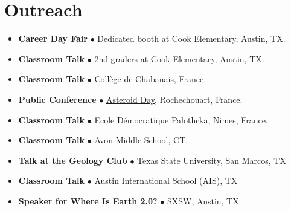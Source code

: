 \section*{Outreach}

\begin{itemize}[leftmargin=3.8em, labelsep=1.5em]
    \setlength\itemsep{-.5em}
    \item[\texttt{2026}] 
    \textbf{Career Day Fair} $\bullet$ Dedicated booth at Cook Elementary, Austin, TX.
    \item[\texttt{2026}] 
    \textbf{Classroom Talk} $\bullet$ 2nd graders at Cook Elementary, Austin, TX.
    \item[\texttt{2025}] 
    \textbf{Classroom Talk} $\bullet$ \href{https://etab.ac-poitiers.fr/coll-chabanais/spip.php?article903}{Collège de Chabanais}, France.
    \item[\texttt{2025}] 
    \textbf{Public Conference} $\bullet$ \href{https://cirir-edu.org/programme-asteroid-day-2025/}{Asteroid Day}, Rochechouart, France.
    \item[\texttt{2025}] 
    \textbf{Classroom Talk} $\bullet$ Ecole Démocratique Palothcka, Nimes, France.
    \item[\texttt{2022}] 
    \textbf{Classroom Talk} $\bullet$ Avon Middle School, CT.
    \item[\texttt{2018}] \textbf{Talk at the Geology Club} $\bullet$ Texas State University, San Marcos, TX
    \item[\texttt{2017}] \textbf{Classroom Talk} $\bullet$ Austin International School (AIS), TX
    \item[\texttt{2016}] \textbf{Speaker for Where Is Earth 2.0?} $\bullet$ SXSW, Austin, TX
\end{itemize}